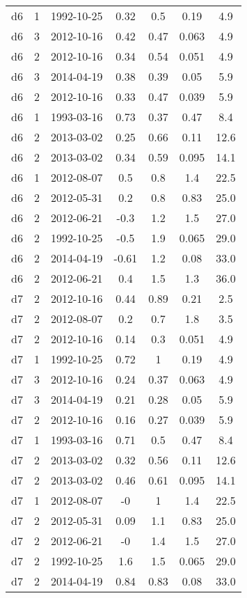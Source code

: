 \begin{table*}[htp]
\begin{tabular}{ccccccc}
d6 & 1 & 1992-10-25 & 0.32 & 0.5 & 0.19 & 4.9 \\
d6 & 3 & 2012-10-16 & 0.42 & 0.47 & 0.063 & 4.9 \\
d6 & 2 & 2012-10-16 & 0.34 & 0.54 & 0.051 & 4.9 \\
d6 & 3 & 2014-04-19 & 0.38 & 0.39 & 0.05 & 5.9 \\
d6 & 2 & 2012-10-16 & 0.33 & 0.47 & 0.039 & 5.9 \\
d6 & 1 & 1993-03-16 & 0.73 & 0.37 & 0.47 & 8.4 \\
d6 & 2 & 2013-03-02 & 0.25 & 0.66 & 0.11 & 12.6 \\
d6 & 2 & 2013-03-02 & 0.34 & 0.59 & 0.095 & 14.1 \\
d6 & 1 & 2012-08-07 & 0.5 & 0.8 & 1.4 & 22.5 \\
d6 & 2 & 2012-05-31 & 0.2 & 0.8 & 0.83 & 25.0 \\
d6 & 2 & 2012-06-21 & -0.3 & 1.2 & 1.5 & 27.0 \\
d6 & 2 & 1992-10-25 & -0.5 & 1.9 & 0.065 & 29.0 \\
d6 & 2 & 2014-04-19 & -0.61 & 1.2 & 0.08 & 33.0 \\
d6 & 2 & 2012-06-21 & 0.4 & 1.5 & 1.3 & 36.0 \\
d7 & 2 & 2012-10-16 & 0.44 & 0.89 & 0.21 & 2.5 \\
d7 & 2 & 2012-08-07 & 0.2 & 0.7 & 1.8 & 3.5 \\
d7 & 2 & 2012-10-16 & 0.14 & 0.3 & 0.051 & 4.9 \\
d7 & 1 & 1992-10-25 & 0.72 & 1 & 0.19 & 4.9 \\
d7 & 3 & 2012-10-16 & 0.24 & 0.37 & 0.063 & 4.9 \\
d7 & 3 & 2014-04-19 & 0.21 & 0.28 & 0.05 & 5.9 \\
d7 & 2 & 2012-10-16 & 0.16 & 0.27 & 0.039 & 5.9 \\
d7 & 1 & 1993-03-16 & 0.71 & 0.5 & 0.47 & 8.4 \\
d7 & 2 & 2013-03-02 & 0.32 & 0.56 & 0.11 & 12.6 \\
d7 & 2 & 2013-03-02 & 0.46 & 0.61 & 0.095 & 14.1 \\
d7 & 1 & 2012-08-07 & -0 & 1 & 1.4 & 22.5 \\
d7 & 2 & 2012-05-31 & 0.09 & 1.1 & 0.83 & 25.0 \\
d7 & 2 & 2012-06-21 & -0 & 1.4 & 1.5 & 27.0 \\
d7 & 2 & 1992-10-25 & 1.6 & 1.5 & 0.065 & 29.0 \\
d7 & 2 & 2014-04-19 & 0.84 & 0.83 & 0.08 & 33.0 \\

\end{tabular}
\end{table*}
